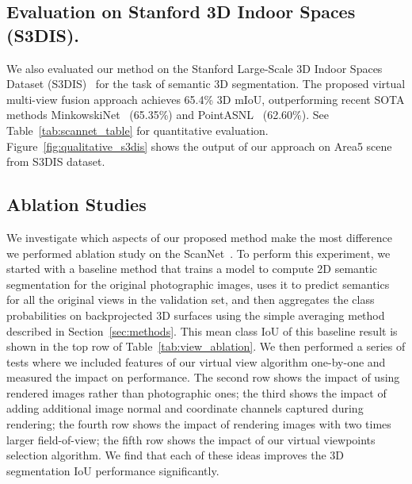 \documentclass[runningheads]{llncs}
\begin{document}
\subsection{Evaluation on Stanford 3D Indoor Spaces (S3DIS).}

We also evaluated our method on the Stanford Large-Scale 3D Indoor Spaces Dataset (S3DIS)~\cite{s3dis_arxiv,s3dis_cvpr16} for the task of semantic 3D segmentation.  The proposed virtual multi-view fusion approach achieves 65.4\% 3D mIoU, outperforming recent SOTA methods MinkowskiNet~\cite{choy20194d} (65.35\%) and PointASNL~\cite{yan2020pointasnl} (62.60\%). See Table~\ref{tab:scannet_table} for quantitative evaluation. Figure~\ref{fig:qualitative_s3dis} shows the output of our approach on Area5 scene from S3DIS dataset.

\subsection{Ablation Studies}\label{sec:experiments_ablation}

We investigate which aspects of our proposed method make the most difference we performed ablation study on the ScanNet~\cite{dai2017scannet}. To perform this experiment, we started with a baseline method that trains a model to compute 2D semantic segmentation for the original photographic images, uses it to predict semantics for all the original views in the validation set, and then aggregates the class probabilities on backprojected 3D surfaces using the simple averaging method described in Section~\ref{sec:methods}.   This mean class IoU of this baseline result is shown in the top row of Table~\ref{tab:view_ablation}.   We then performed a series of tests where we included features of our virtual view algorithm one-by-one and measured the impact on performance.   The second row shows the impact of using rendered images rather than photographic ones; the third shows the impact of adding additional image normal and coordinate channels captured during rendering; the fourth row shows the impact of rendering images with two times larger field-of-view; the fifth row shows the impact of our virtual viewpoints selection algorithm. We find that each of these ideas improves the 3D segmentation IoU performance significantly.  
\end{document}
